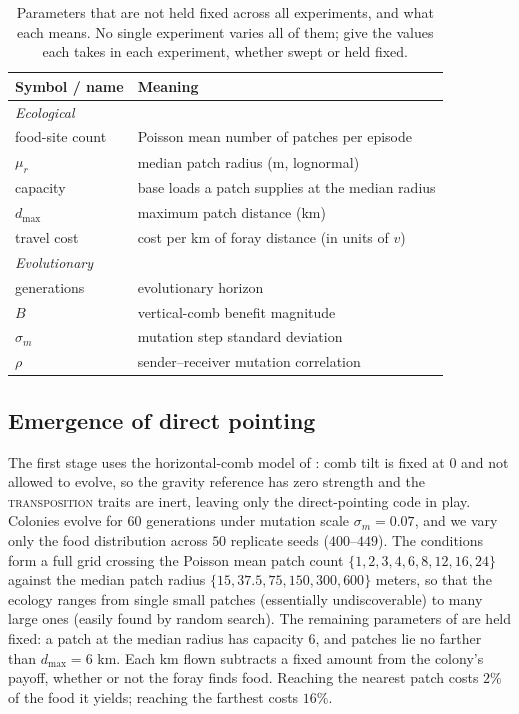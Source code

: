 \documentclass[11pt]{article}
\newcommand{\trait}[1]{\textsc{#1}}
\begin{document}
\begin{table}
  \centering
  \begin{tabular}{ll}
    \toprule
    Symbol / name & Meaning \\
    \midrule
    \multicolumn{2}{l}{\emph{Ecological}} \\
    food-site count & Poisson mean number of patches per episode \\
    $\mu_r$        & median patch radius (m, lognormal) \\
    capacity        & base loads a patch supplies at the median radius \\
    $d_{\max}$      & maximum patch distance (km) \\
    travel cost     & cost per km of foray distance (in units of $v$) \\
    \midrule
    \multicolumn{2}{l}{\emph{Evolutionary}} \\
    generations & evolutionary horizon \\
    $B$        & vertical-comb benefit magnitude \\
    $\sigma_m$ & mutation step standard deviation \\
    $\rho$     & sender--receiver mutation correlation \\
    \bottomrule
  \end{tabular}
  \caption{Parameters that are not held fixed across all experiments, and what
    each means. No single experiment varies all of them;
     give the values each takes
    in each experiment, whether swept or held fixed.}
  \label{tab:varied-params}
\end{table}

\subsection{Emergence of direct pointing}
\label{sec:setup-horizontal}
The first stage uses the horizontal-comb model of : comb
tilt is fixed at $0$ and not allowed to evolve, so the gravity reference has zero
strength and the \trait{transposition} traits are inert, leaving only the direct-pointing
code in play. Colonies evolve for $60$ generations under mutation scale
$\sigma_m = 0.07$, and we vary only the food distribution across $50$ replicate
seeds ($400$--$449$). The conditions form a full grid crossing the Poisson mean
patch count $\{1,2,3,4,6,8,12,16,24\}$ against the median patch radius
$\{15, 37.5, 75, 150, 300, 600\}$ meters, so that the ecology ranges from single small
patches (essentially undiscoverable) to many large ones (easily found by random
search). The remaining parameters of  are held fixed: a
patch at the median radius has capacity $6$, and patches lie no farther than
$d_{\max} = 6$ km. Each km flown subtracts a fixed amount from the colony's
payoff, whether or not the foray finds food. Reaching the nearest patch costs
$2\%$ of the food it yields; reaching the farthest costs $16\%$.
\end{document}
